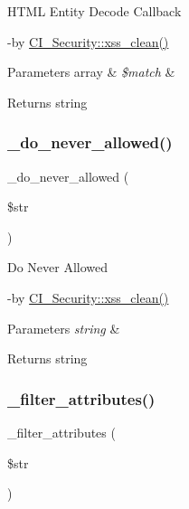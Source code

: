 H\+T\+ML Entity Decode Callback

-\/by \mbox{\hyperlink{class_c_i___security_acb759426dbab128d3d8164805225381c}{C\+I\+\_\+\+Security\+::xss\+\_\+clean()}} 
\begin{DoxyParams}[1]{Parameters}
array & {\em \$match} & \\
\hline
\end{DoxyParams}
\begin{DoxyReturn}{Returns}
string 
\end{DoxyReturn}
\mbox{\label{class_c_i___security_a61217e43f888cdf8afb1fba16b5cd9f6}} 
\subsubsection{\texorpdfstring{\+\_\+do\+\_\+never\+\_\+allowed()}{\_do\_never\_allowed()}}
{\footnotesize\ttfamily \+\_\+do\+\_\+never\+\_\+allowed (\begin{DoxyParamCaption}\item[{}]{\$str }\end{DoxyParamCaption})\hspace{0.3cm}{\ttfamily [protected]}}

Do Never Allowed

-\/by \mbox{\hyperlink{class_c_i___security_acb759426dbab128d3d8164805225381c}{C\+I\+\_\+\+Security\+::xss\+\_\+clean()}} 
\begin{DoxyParams}{Parameters}
{\em string} & \\
\hline
\end{DoxyParams}
\begin{DoxyReturn}{Returns}
string 
\end{DoxyReturn}
\mbox{\label{class_c_i___security_aa385a9c7527f5eece656b9cac73979d3}} 
\subsubsection{\texorpdfstring{\+\_\+filter\+\_\+attributes()}{\_filter\_attributes()}}
{\footnotesize\ttfamily \+\_\+filter\+\_\+attributes (\begin{DoxyParamCaption}\item[{}]{\$str }\end{DoxyParamCaption})\hspace{0.3cm}{\ttfamily [protected]}}

